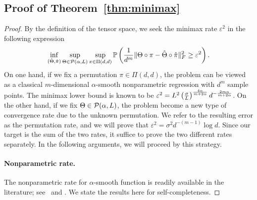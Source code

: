 \documentclass[12pt]{article}
\theoremstyle{definition}
\begin{document}
\subsection{Proof of Theorem~\ref{thm:minimax}}
\begin{proof} By the definition of the tensor space, we seek the minimax rate $\varepsilon^2$ in the following expression
\begin{equation}\label{eq:final}
\inf_{(\hat \Theta,\hat \pi)}\sup_{\Theta\in \mathcal{P}(\alpha,L)}\sup_{\pi\in\Pi(d,d)} \mathbb{P}\left({1\over d^m}\lVert\Theta\circ \pi-\hat \Theta\circ \hat \pi\rVert_F^2 \geq \varepsilon^2 \right).
\end{equation}
On one hand, if we fix a permutation $\pi\in\Pi(d,d)$, the problem can be viewed as a classical $m$-dimensional $\alpha$-smooth nonparametric regression with $d^m$ sample points. The minimax lower bound is known to be $\varepsilon^2=L^2\left(\sigma\over L\right)^{4\alpha\over m+2\alpha}d^{-{2m\alpha\over m+2\alpha}}$. On the other hand, if we fix $\Theta\in\mathcal{P}(\alpha,L)$, the problem become a new type of convergence rate due to the unknown permutation. We refer to the resulting error as the permutation rate, and we will prove that $\varepsilon^2=\sigma^2 d^{-(m-1)}\log d$. Since our target is the sum of the two rates, it suffice to prove the two different rates separately. In the following arguments, we will proceed by this strategy. 

\paragraph{Nonparametric rate.} The nonparametric rate for $\alpha$-smooth function is readily available in the literature; see \citet[Section 3.2]{gyorfi2002distribution}~and \citet[Section 2]{stone1982optimal}. We state the results here for self-completeness. 


\end{proof}
\end{document}
